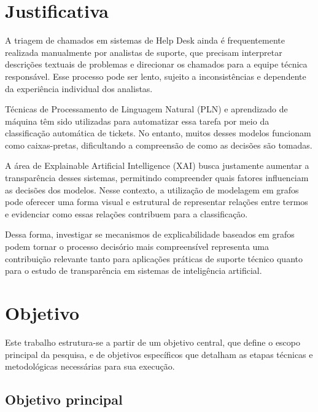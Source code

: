 \documentclass[
    12pt,                %
    openright,           %
    oneside,             %
    a4paper,             %
    english,             %
    brazil               %
]{abntex2}
\begin{document}

\section{Justificativa}
\label{sec:justificativa}

A triagem de chamados em sistemas de Help Desk ainda é frequentemente realizada manualmente por analistas de suporte, que precisam interpretar descrições textuais de problemas e direcionar os chamados para a equipe técnica responsável. Esse processo pode ser lento, sujeito a inconsistências e dependente da experiência individual dos analistas.

Técnicas de Processamento de Linguagem Natural (PLN) e aprendizado de máquina têm sido utilizadas para automatizar essa tarefa por meio da classificação automática de tickets. No entanto, muitos desses modelos funcionam como caixas-pretas, dificultando a compreensão de como as decisões são tomadas.

A área de Explainable Artificial Intelligence (XAI) busca justamente aumentar a transparência desses sistemas, permitindo compreender quais fatores influenciam as decisões dos modelos. Nesse contexto, a utilização de modelagem em grafos pode oferecer uma forma visual e estrutural de representar relações entre termos e evidenciar como essas relações contribuem para a classificação.

Dessa forma, investigar se mecanismos de explicabilidade baseados em grafos podem tornar o processo decisório mais compreensível representa uma contribuição relevante tanto para aplicações práticas de suporte técnico quanto para o estudo de transparência em sistemas de inteligência artificial.

\section{Objetivo}
\label{sec:objetivo}

Este trabalho estrutura-se a partir de um objetivo central, que define o escopo principal da pesquisa, e de objetivos específicos que detalham as etapas técnicas e metodológicas necessárias para sua execução. 

\subsection{Objetivo principal}
\end{document}

